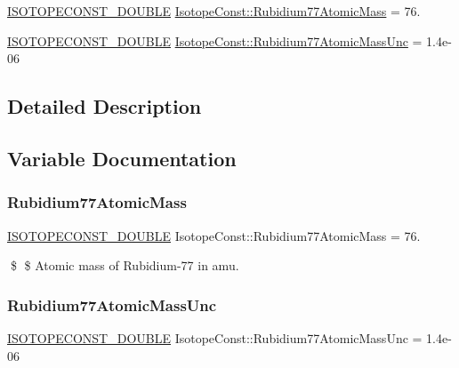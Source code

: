 \begin{DoxyCompactItemize}
\item 
\mbox{\hyperlink{group___isotope_const-_macros_ga8f45a7272ce02c0b4c65c44636ed719a}{I\+S\+O\+T\+O\+P\+E\+C\+O\+N\+S\+T\+\_\+\+D\+O\+U\+B\+LE}} \mbox{\hyperlink{group___isotope_const-_rubidium-_rb77_ga5c01c15b4db40a3240b8e4e70a52008d}{Isotope\+Const\+::\+Rubidium77\+Atomic\+Mass}} = 76.
\item 
\mbox{\hyperlink{group___isotope_const-_macros_ga8f45a7272ce02c0b4c65c44636ed719a}{I\+S\+O\+T\+O\+P\+E\+C\+O\+N\+S\+T\+\_\+\+D\+O\+U\+B\+LE}} \mbox{\hyperlink{group___isotope_const-_rubidium-_rb77_gaa8da3f30151828f4ef5896c8fe37adf4}{Isotope\+Const\+::\+Rubidium77\+Atomic\+Mass\+Unc}} = 1.\+4e-\/06
\end{DoxyCompactItemize}


\subsection{Detailed Description}


\subsection{Variable Documentation}
\mbox{\label{group___isotope_const-_rubidium-_rb77_ga5c01c15b4db40a3240b8e4e70a52008d}} 
\subsubsection{\texorpdfstring{Rubidium77\+Atomic\+Mass}{Rubidium77AtomicMass}}
{\footnotesize\ttfamily \mbox{\hyperlink{group___isotope_const-_macros_ga8f45a7272ce02c0b4c65c44636ed719a}{I\+S\+O\+T\+O\+P\+E\+C\+O\+N\+S\+T\+\_\+\+D\+O\+U\+B\+LE}} Isotope\+Const\+::\+Rubidium77\+Atomic\+Mass = 76.}

\$ \$ Atomic mass of Rubidium-\/77 in amu. \mbox{\label{group___isotope_const-_rubidium-_rb77_gaa8da3f30151828f4ef5896c8fe37adf4}} 
\subsubsection{\texorpdfstring{Rubidium77\+Atomic\+Mass\+Unc}{Rubidium77AtomicMassUnc}}
{\footnotesize\ttfamily \mbox{\hyperlink{group___isotope_const-_macros_ga8f45a7272ce02c0b4c65c44636ed719a}{I\+S\+O\+T\+O\+P\+E\+C\+O\+N\+S\+T\+\_\+\+D\+O\+U\+B\+LE}} Isotope\+Const\+::\+Rubidium77\+Atomic\+Mass\+Unc = 1.\+4e-\/06}

